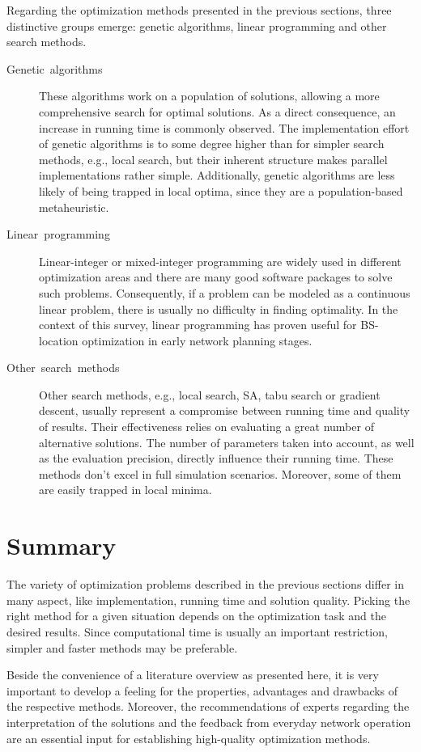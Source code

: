 Regarding the optimization methods presented in the previous sections,
three distinctive groups emerge: genetic algorithms, linear programming
and other search methods.
\begin{description}
\item [{Genetic~algorithms}] These algorithms work on a population of
solutions, allowing a more comprehensive search for optimal solutions.
As a direct consequence, an increase in running time is commonly observed.
The implementation effort of genetic algorithms is to some degree
higher than for simpler search methods, e.g., local search, but their
inherent structure makes parallel implementations rather simple. Additionally,
genetic algorithms are less likely of being trapped in local optima,
since they are a population-based metaheuristic.
\item [{Linear~programming}] Linear-integer or mixed-integer programming
are widely used in different optimization areas and there are many
good software packages to solve such problems. Consequently, if a
problem can be modeled as a continuous linear problem, there is usually
no difficulty in finding optimality. In the context of this survey,
linear programming has proven useful for BS-location optimization
in early network planning stages.
\item [{Other~search~methods}] Other search methods, e.g., local search,
SA, tabu search or gradient descent, usually represent a compromise
between running time and quality of results. Their effectiveness relies
on evaluating a great number of alternative solutions. The number
of parameters taken into account, as well as the evaluation precision,
directly influence their running time. These methods don't excel in
full simulation scenarios. Moreover, some of them are easily trapped
in local minima.
\end{description}

\section{Summary}

The variety of optimization problems described in the previous sections
differ in many aspect, like implementation, running time and solution
quality. Picking the right method for a given situation depends on
the optimization task and the desired results. Since computational
time is usually an important restriction, simpler and faster methods
may be preferable.

Beside the convenience of a literature overview as presented here,
it is very important to develop a feeling for the properties, advantages
and drawbacks of the respective methods. Moreover, the recommendations
of experts regarding the interpretation of the solutions and the feedback
from everyday network operation are an essential input for establishing
high-quality optimization methods.

